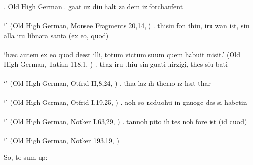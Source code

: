 \ex. Old High German
\ag. gaat uz diu halt za dem iz forchaufent\\
 \\
 `' \hfill (Old High German, Monsee Fragments 20,14, \citealt[761]{behaghel1923})
\bg. thisiu fon thiu, iru wan ist, siu alla iru libnara santa (ex eo, quod)\\
 \\
 `hæc autem ex eo quod deest illi, totum victum suum quem habuit misit.' \hfill (Old High German, Tatian 118,1, \citealt[761]{behaghel1923})
\bg. thaz iru thiu sin guati nirzigi, thes siu bati\\
 \\
 `' \hfill (Old High German, Otfrid II,8,24, \citealt[761]{behaghel1923})
\bg. thia laz ih themo iz lisit thar\\
 \\
 `' \hfill (Old High German, Otfrid I,19,25, \citealt[761]{behaghel1923})
\bg. noh so neduohti in gnuoge des si habetin\\
 \\
 `' \hfill (Old High German, Notker I,63,29, \citealt[761]{behaghel1923})
\bg. tannoh pito ih tes noh fore ist (id quod)\\
 \\
 `' \hfill (Old High German, Notker 193,19, \citealt[761]{behaghel1923})

So, to sum up:





